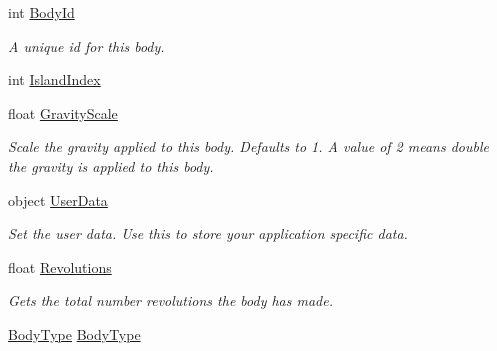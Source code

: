 \begin{DoxyCompactItemize}
\item 
int \hyperlink{class_farseer_physics_1_1_dynamics_1_1_body_acd7e9a50b5719b3e01ac23dd06477fcc}{Body\+Id}
\begin{DoxyCompactList}\small\item\em A unique id for this body. \end{DoxyCompactList}\item 
int \hyperlink{class_farseer_physics_1_1_dynamics_1_1_body_a056b7c7b72cb217cfcaa11560b712c2c}{Island\+Index}
\item 
float \hyperlink{class_farseer_physics_1_1_dynamics_1_1_body_aaf6bfac0accc22e0ed08d4a11d3917c6}{Gravity\+Scale}
\begin{DoxyCompactList}\small\item\em Scale the gravity applied to this body. Defaults to 1. A value of 2 means double the gravity is applied to this body. \end{DoxyCompactList}\item 
object \hyperlink{class_farseer_physics_1_1_dynamics_1_1_body_a5180456df73f44075cd865b3dfedc9c8}{User\+Data}
\begin{DoxyCompactList}\small\item\em Set the user data. Use this to store your application specific data. \end{DoxyCompactList}\item 
float \hyperlink{class_farseer_physics_1_1_dynamics_1_1_body_a361a74c6501d8cf5b4a176bfed815cfe}{Revolutions}
\begin{DoxyCompactList}\small\item\em Gets the total number revolutions the body has made. \end{DoxyCompactList}\item 
\hyperlink{namespace_farseer_physics_1_1_dynamics_ab48af7c74608f717f279410b48d77199}{Body\+Type} \hyperlink{class_farseer_physics_1_1_dynamics_1_1_body_a5cab6dcf07e3bfbc0a6546e031dca134}{Body\+Type}

\end{DoxyCompactItemize}
